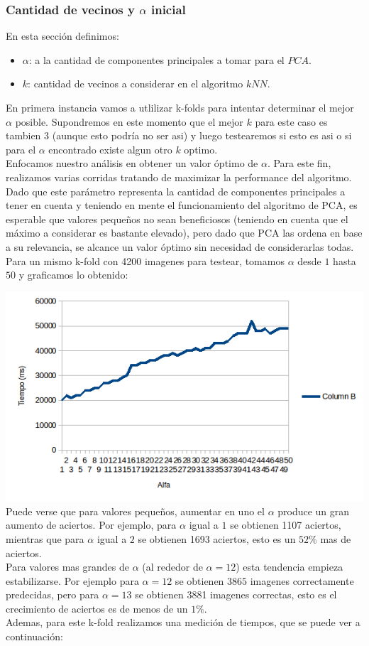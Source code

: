 \subsubsection{Cantidad de vecinos y $\alpha$ inicial}
En esta sección definimos:
\begin{itemize}
	\item $\alpha$: a la cantidad de componentes principales a tomar para el $PCA$.
	\item $k$: cantidad de vecinos a considerar en el algoritmo $kNN$.
\end{itemize}
En primera instancia vamos a utlilizar k-folds para intentar determinar el mejor $\alpha$ posible. Supondremos en este momento que el mejor $k$ para este caso es tambien $3$ (aunque esto podría no ser asi) y luego testearemos si esto es asi o si para el $\alpha$ encontrado existe algun otro $k$ optimo.
\\
Enfocamos nuestro análisis en obtener un valor óptimo de $\alpha$. Para este fin, realizamos varias corridas tratando de maximizar la performance del algoritmo. Dado que este parámetro representa la cantidad de componentes principales a tener en cuenta y teniendo en mente el funcionamiento del algoritmo de PCA, es esperable que valores pequeños no sean beneficiosos (teniendo en cuenta que el máximo a considerar es bastante elevado), pero dado que PCA las ordena en base a su relevancia, se alcance un valor óptimo sin necesidad de considerarlas todas. Para un mismo k-fold con 4200 imagenes para testear, tomamos $\alpha$ desde $1$ hasta $50$ y graficamos lo obtenido:

\includegraphics[scale=0.75]{nuevosResultados/pca/pca1.png}\\

Puede verse que para valores pequeños, aumentar en uno el $\alpha$ produce un gran aumento de aciertos. Por ejemplo, para $\alpha$ igual a $1$ se obtienen 1107 aciertos, mientras que para $\alpha$ igual a $2$ se obtienen 1693 aciertos, esto es un $52\%$ mas de aciertos.
\\
Para valores mas grandes de $\alpha$ (al rededor de $\alpha = 12$) esta tendencia empieza estabilizarse. Por ejemplo para $\alpha = 12$ se obtienen $3865$ imagenes correctamente predecidas, pero para $\alpha = 13$ se obtienen 3881 imagenes correctas, esto es el crecimiento de aciertos es de menos de un $1\%$.
\\
Ademas, para este k-fold realizamos una medición de tiempos, que se puede ver a continuación:

